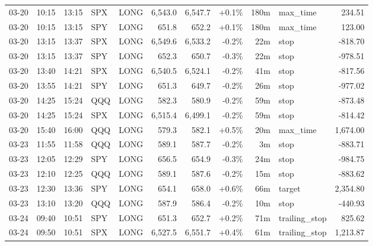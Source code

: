 \documentclass[11pt,a4paper,twoside]{article}
\begin{document}
\begin{center}
\begin{longtable}{>{\color{txtmain}}l l l l l r r r r >{\color{txtmain}}l r}
03-20 & 10:15 & 13:15 & SPX & LONG & 6,543.0 & 6,547.7 & \textcolor{wingreen}{+0.1\%} & 180m & max\_time & \textcolor{wingreen}{234.51} \\
03-20 & 10:15 & 13:15 & SPY & LONG & 651.8 & 652.2 & \textcolor{wingreen}{+0.1\%} & 180m & max\_time & \textcolor{wingreen}{123.00} \\
03-20 & 13:15 & 13:37 & SPX & LONG & 6,549.6 & 6,533.2 & \textcolor{lossred}{-0.2\%} & 22m & stop & \textcolor{lossred}{-818.70} \\
03-20 & 13:15 & 13:37 & SPY & LONG & 652.3 & 650.7 & \textcolor{lossred}{-0.3\%} & 22m & stop & \textcolor{lossred}{-978.51} \\
03-20 & 13:40 & 14:21 & SPX & LONG & 6,540.5 & 6,524.1 & \textcolor{lossred}{-0.2\%} & 41m & stop & \textcolor{lossred}{-817.56} \\
03-20 & 13:55 & 14:21 & SPY & LONG & 651.3 & 649.7 & \textcolor{lossred}{-0.2\%} & 26m & stop & \textcolor{lossred}{-977.02} \\
03-20 & 14:25 & 15:24 & QQQ & LONG & 582.3 & 580.9 & \textcolor{lossred}{-0.2\%} & 59m & stop & \textcolor{lossred}{-873.48} \\
03-20 & 14:25 & 15:24 & SPX & LONG & 6,515.4 & 6,499.1 & \textcolor{lossred}{-0.2\%} & 59m & stop & \textcolor{lossred}{-814.42} \\
03-20 & 15:40 & 16:00 & QQQ & LONG & 579.3 & 582.1 & \textcolor{wingreen}{+0.5\%} & 20m & max\_time & \textcolor{wingreen}{1,674.00} \\
03-23 & 11:55 & 11:58 & QQQ & LONG & 589.1 & 587.7 & \textcolor{lossred}{-0.2\%} & 3m & stop & \textcolor{lossred}{-883.71} \\
03-23 & 12:05 & 12:29 & SPY & LONG & 656.5 & 654.9 & \textcolor{lossred}{-0.3\%} & 24m & stop & \textcolor{lossred}{-984.75} \\
03-23 & 12:10 & 12:25 & QQQ & LONG & 589.1 & 587.6 & \textcolor{lossred}{-0.2\%} & 15m & stop & \textcolor{lossred}{-883.62} \\
03-23 & 12:30 & 13:36 & SPY & LONG & 654.1 & 658.0 & \textcolor{wingreen}{+0.6\%} & 66m & target & \textcolor{wingreen}{2,354.80} \\
03-23 & 13:10 & 13:20 & QQQ & LONG & 587.9 & 586.4 & \textcolor{lossred}{-0.2\%} & 10m & stop & \textcolor{lossred}{-440.93} \\
03-24 & 09:40 & 10:51 & SPY & LONG & 651.3 & 652.7 & \textcolor{wingreen}{+0.2\%} & 71m & trailing\_stop & \textcolor{wingreen}{825.62} \\
03-24 & 09:50 & 10:51 & SPX & LONG & 6,527.5 & 6,551.7 & \textcolor{wingreen}{+0.4\%} & 61m & trailing\_stop & \textcolor{wingreen}{1,213.87} \\

\end{longtable}
\end{center}
\end{document}
